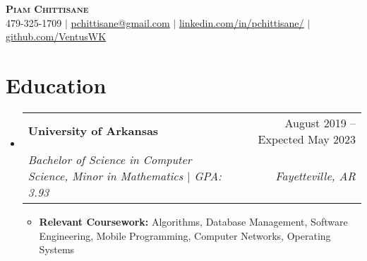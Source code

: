 \documentclass[letterpaper,11pt]{article}
\makeatletter
\newcommand{\resumeItem}[1]{
  \item\small{
    {#1 \vspace{-2pt}}
  }
}
\newcommand{\resumeSubheading}[4]{
  \vspace{-2pt}\item
    \begin{tabular*}{0.97\textwidth}[t]{l@{\extracolsep{\fill}}r}
      \textbf{#1} & #2 \\
      \textit{\small#3} & \textit{\small #4} \\
    \end{tabular*}\vspace{-7pt}
}
\newcommand{\resumeSubSubheading}[2]{
    \item
    \begin{tabular*}{0.97\textwidth}{l@{\extracolsep{\fill}}r}
      \textit{\small#1} & \textit{\small #2} \\
    \end{tabular*}\vspace{-7pt}
}
\newcommand{\resumeSubHeadingListStart}{\begin{itemize}[leftmargin=0.15in, label={}]}
\newcommand{\resumeSubHeadingListEnd}{\end{itemize}}
\newcommand{\resumeItemListStart}{\begin{itemize}}
\newcommand{\resumeItemListEnd}{\end{itemize}\vspace{-5pt}}
\makeatother
\begin{document}

\begin{center}
    \textbf{\Huge \scshape Piam Chittisane} \\ \vspace{1pt}
    \small 479-325-1709 $|$ \href{mailto:pchittisane@gmail.com}{\underline{pchittisane@gmail.com}} $|$ 
    \href{https://linkedin.com/in/pchittisane}{\underline{linkedin.com/in/pchittisane/}} $|$
    \href{https://github.com/VentusWK}{\underline{github.com/VentusWK}}
\end{center}


\section{Education}
  \resumeSubHeadingListStart
    \resumeSubheading
      {University of Arkansas}{August 2019 -- Expected May 2023}
      {Bachelor of Science in Computer Science, Minor in Mathematics $\mid$ GPA: 3.93}{Fayetteville, AR}
      \resumeItemListStart
        \resumeItem{\textbf{Relevant Coursework:}{ Algorithms, Database Management, Software Engineering, Mobile Programming, Computer Networks, Operating Systems} }
      \resumeItemListEnd
  \resumeSubHeadingListEnd
  



      
\end{document}
